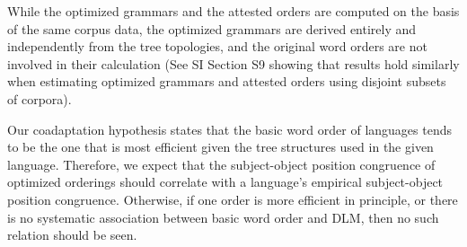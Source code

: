 \documentclass[9pt,twocolumn,twoside,lineno]{pnas-new}
\begin{document}
While the optimized grammars and the attested orders are computed on the basis of the same corpus data, the optimized grammars are derived entirely and independently from the tree topologies, and the original word orders are not involved in their calculation (See SI Section S9 showing that results hold similarly when estimating optimized grammars and attested orders using disjoint subsets of corpora).



Our coadaptation hypothesis states that the basic word order of languages tends to be the one that is most efficient given the tree structures used in the given language.
Therefore, we expect that the subject-object position congruence of optimized orderings should correlate with a language's empirical subject-object position congruence.
Otherwise, if one order is more efficient in principle, or there is no systematic association between basic word order and DLM, then no such relation should be seen.
\end{document}
